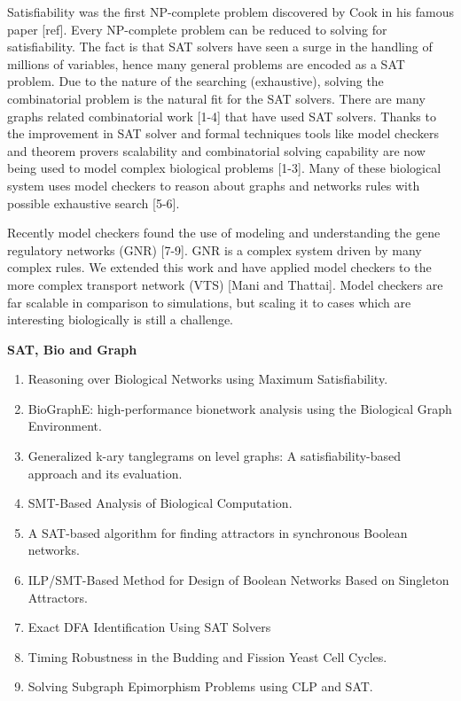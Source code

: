 
Satisfiability was the first NP-complete problem discovered by Cook in his famous paper [ref]. Every NP-complete problem can be reduced to solving for satisfiability. The fact is that SAT solvers have seen a surge in the handling of millions of variables, hence many general problems are encoded as a SAT problem. Due to the nature of the searching (exhaustive), solving the combinatorial problem is the natural fit for the SAT solvers. There are many graphs related combinatorial work [1-4] that have used SAT solvers. Thanks to the improvement in SAT solver and formal techniques tools like model checkers and theorem provers scalability and combinatorial solving capability are now being used to model complex biological problems [1-3].
Many of these biological system uses model checkers to reason about graphs and networks rules with possible exhaustive search [5-6].  

Recently model checkers found the use of modeling and understanding the gene regulatory networks (GNR) [7-9]. GNR is a complex system driven by many complex rules. We extended this work and have applied model checkers to the more complex transport network (VTS) [Mani and Thattai]. Model checkers are far scalable in comparison to simulations, but scaling it to cases which are interesting biologically is still a challenge.


\textbf{SAT, Bio and Graph}
\begin{enumerate}
\item Reasoning over Biological Networks using Maximum Satisfiability.
\item BioGraphE: high-performance bionetwork analysis using the Biological Graph Environment.
\item Generalized k-ary tanglegrams on level graphs: A satisfiability-based approach and its evaluation.
\item SMT-Based Analysis of Biological Computation.
\item A SAT-based algorithm for finding attractors in synchronous Boolean networks.
\item ILP/SMT-Based Method for Design of Boolean Networks Based on Singleton Attractors.
\item Exact DFA Identification Using SAT Solvers
\item Timing Robustness in the Budding and Fission Yeast Cell Cycles.
\item Solving Subgraph Epimorphism Problems using CLP
and SAT.
\end{enumerate}

